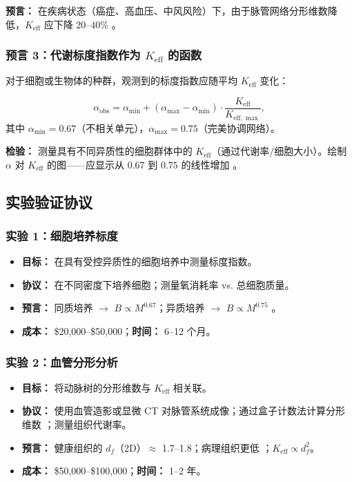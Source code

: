 \documentclass[12pt]{article}
\newcommand{\Keff}{K_{\mathrm{eff}}}
\begin{document}
	\textbf{预言：} 在疾病状态（癌症、高血压、中风风险）下，由于脉管网络分形维数降低，\(\Keff\) 应下降 \(20\)–\(40\%\) \cite{Gould1993}。
	
	\subsubsection{预言 3：代谢标度指数作为 $\Keff$ 的函数}
	
	对于细胞或生物体的种群，观测到的标度指数应随平均 $\Keff$ 变化：
	
	\begin{equation}
		\alpha_{\text{obs}} = \alpha_{\min} + (\alpha_{\max} - \alpha_{\min}) \cdot \frac{\Keff}{K_{\mathrm{eff},\max}},
		\label{eq:scaling-exponent}
	\end{equation}
	其中 $\alpha_{\min} = 0.67$（不相关单元），$\alpha_{\max} = 0.75$（完美协调网络）。
	
	\textbf{检验：} 测量具有不同异质性的细胞群体中的 $\Keff$（通过代谢率/细胞大小）。绘制 $\alpha$ 对 $\Keff$ 的图——应显示从 $0.67$ 到 $0.75$ 的线性增加 \cite{Takemoto2015}。
	
	\subsection{实验验证协议}
	
	\subsubsection{实验 1：细胞培养标度}
	\begin{itemize}
		\item \textbf{目标：} 在具有受控异质性的细胞培养中测量标度指数。
		\item \textbf{协议：} 在不同密度下培养细胞；测量氧消耗率 vs. 总细胞质量。
		\item \textbf{预言：} 同质培养 \(\rightarrow\) \(B \propto M^{0.67}\)；异质培养 \(\rightarrow\) \(B \propto M^{0.75}\) \cite{Takemoto2015}。
		\item \textbf{成本：} \$20,000–\$50,000；\textbf{时间：} 6–12 个月。
	\end{itemize}
	
	\subsubsection{实验 2：血管分形分析}
	\begin{itemize}
		\item \textbf{目标：} 将动脉树的分形维数与 \(\Keff\) 相关联。
		\item \textbf{协议：} 使用血管造影或显微 CT 对脉管系统成像；通过盒子计数法计算分形维数 \cite{Cross1993}；测量组织代谢率。
		\item \textbf{预言：} 健康组织的 \(d_f\)（2D）\(\approx\) 1.7–1.8；病理组织更低 \cite{Gould1993}；\(\Keff \propto d_f^2\)。
		\item \textbf{成本：} \$50,000–\$100,000；\textbf{时间：} 1–2 年。
	\end{itemize}
	
\end{document}
